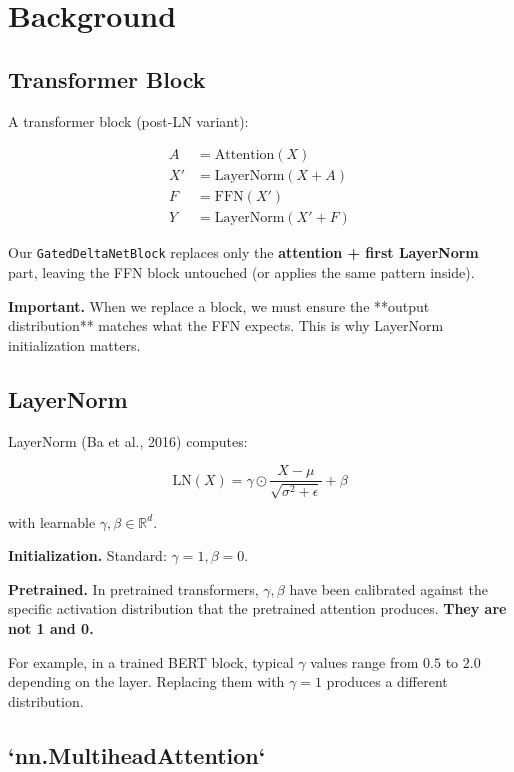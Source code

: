 
\section{Background}

\subsection{Transformer Block}

A transformer block (post-LN variant):

\[
\begin{aligned}
A &= \text{Attention}(X) \\
X' &= \text{LayerNorm}(X + A) \\
F &= \text{FFN}(X') \\
Y &= \text{LayerNorm}(X' + F)
\end{aligned}
\tag{3.1}
\]

Our \texttt{GatedDeltaNetBlock} replaces only the \textbf{attention + first LayerNorm} 
part, leaving the FFN block untouched (or applies the same pattern inside).

\textbf{Important.} When we replace a block, we must ensure the **output 
distribution** matches what the FFN expects. This is why LayerNorm 
initialization matters.

\subsection{LayerNorm}

LayerNorm (Ba et al., 2016) computes:

\[
\text{LN}(X) = \gamma \odot \frac{X - \mu}{\sqrt{\sigma^2 + \epsilon}} + \beta
\tag{3.2}
\]

with learnable $\gamma, \beta \in \mathbb{R}^d$.

\textbf{Initialization.} Standard: $\gamma = 1, \beta = 0$.

\textbf{Pretrained.} In pretrained transformers, $\gamma, \beta$ have been 
calibrated against the specific activation distribution that the pretrained 
attention produces. \textbf{They are not 1 and 0.}

For example, in a trained BERT block, typical $\gamma$ values range from 
$0.5$ to $2.0$ depending on the layer. Replacing them with $\gamma = 1$ 
produces a different distribution.

\subsection{`nn.MultiheadAttention`}


